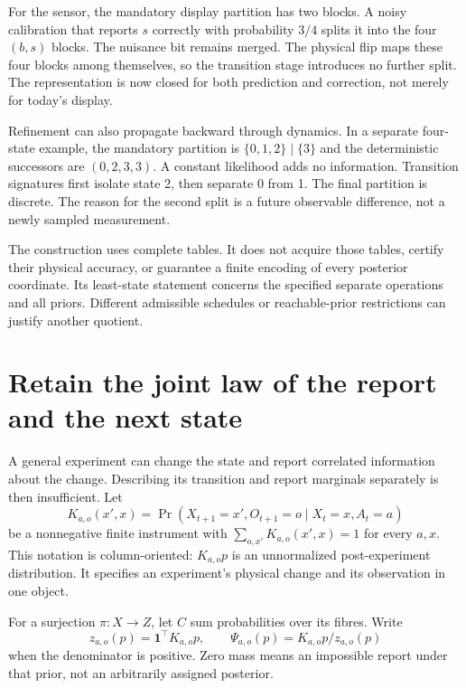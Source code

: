\documentclass[11pt,oneside,openany]{book}
\theoremstyle{definition}\newtheorem{definition}[theorem]{Definition}
\begin{document}
For the sensor, the mandatory display partition has two blocks. A noisy calibration that reports $s$ correctly with probability $3/4$ splits it into the four $(b,s)$ blocks. The nuisance bit remains merged. The physical flip maps these four blocks among themselves, so the transition stage introduces no further split. The representation is now closed for both prediction and correction, not merely for today's display.

Refinement can also propagate backward through dynamics. In a separate four-state example, the mandatory partition is $\{0,1,2\}\mid\{3\}$ and the deterministic successors are $(0,2,3,3)$. A constant likelihood adds no information. Transition signatures first isolate state 2, then separate 0 from 1. The final partition is discrete. The reason for the second split is a future observable difference, not a newly sampled measurement.

The construction uses complete tables. It does not acquire those tables, certify their physical accuracy, or guarantee a finite encoding of every posterior coordinate. Its least-state statement concerns the specified separate operations and all priors. Different admissible schedules or reachable-prior restrictions can justify another quotient.

\section{Retain the joint law of the report and the next state}
A general experiment can change the state and report correlated information about the change. Describing its transition and report marginals separately is then insufficient. Let
\[
 K_{a,o}(x',x)=\Pr(X_{t+1}=x',O_{t+1}=o\mid X_t=x,A_t=a)
\]
be a nonnegative finite instrument with $\sum_{o,x'}K_{a,o}(x',x)=1$ for every $a,x$. This notation is column-oriented: $K_{a,o}p$ is an unnormalized post-experiment distribution. It specifies an experiment's physical change and its observation in one object.

For a surjection $\pi:X\to Z$, let $C$ sum probabilities over its fibres. Write
\[
 z_{a,o}(p)=\mathbf1^\top K_{a,o}p,\qquad
 \Psi_{a,o}(p)=K_{a,o}p/z_{a,o}(p)
\]
when the denominator is positive. Zero mass means an impossible report under that prior, not an arbitrarily assigned posterior.
\end{document}
